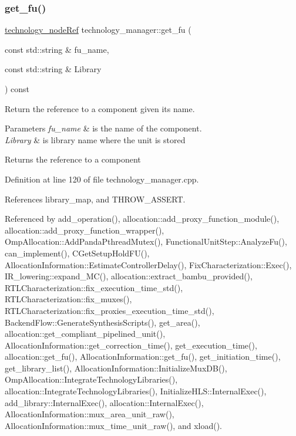 \subsubsection{\texorpdfstring{get\+\_\+fu()}{get\_fu()}}
{\footnotesize\ttfamily \hyperlink{technology__node_8hpp_a33dd193b7bd6b987bf0d8a770a819fa7}{technology\+\_\+node\+Ref} technology\+\_\+manager\+::get\+\_\+fu (\begin{DoxyParamCaption}\item[{const std\+::string \&}]{fu\+\_\+name,  }\item[{const std\+::string \&}]{Library }\end{DoxyParamCaption}) const}



Return the reference to a component given its name. 


\begin{DoxyParams}{Parameters}
{\em fu\+\_\+name} & is the name of the component. \\
\hline
{\em Library} & is library name where the unit is stored \\
\hline
\end{DoxyParams}
\begin{DoxyReturn}{Returns}
the reference to a component 
\end{DoxyReturn}


Definition at line 120 of file technology\+\_\+manager.\+cpp.



References library\+\_\+map, and T\+H\+R\+O\+W\+\_\+\+A\+S\+S\+E\+RT.



Referenced by add\+\_\+operation(), allocation\+::add\+\_\+proxy\+\_\+function\+\_\+module(), allocation\+::add\+\_\+proxy\+\_\+function\+\_\+wrapper(), Omp\+Allocation\+::\+Add\+Panda\+Pthread\+Mutex(), Functional\+Unit\+Step\+::\+Analyze\+Fu(), can\+\_\+implement(), C\+Get\+Setup\+Hold\+F\+U(), Allocation\+Information\+::\+Estimate\+Controller\+Delay(), Fix\+Characterization\+::\+Exec(), I\+R\+\_\+lowering\+::expand\+\_\+\+M\+C(), allocation\+::extract\+\_\+bambu\+\_\+provided(), R\+T\+L\+Characterization\+::fix\+\_\+execution\+\_\+time\+\_\+std(), R\+T\+L\+Characterization\+::fix\+\_\+muxes(), R\+T\+L\+Characterization\+::fix\+\_\+proxies\+\_\+execution\+\_\+time\+\_\+std(), Backend\+Flow\+::\+Generate\+Synthesis\+Scripts(), get\+\_\+area(), allocation\+::get\+\_\+compliant\+\_\+pipelined\+\_\+unit(), Allocation\+Information\+::get\+\_\+correction\+\_\+time(), get\+\_\+execution\+\_\+time(), allocation\+::get\+\_\+fu(), Allocation\+Information\+::get\+\_\+fu(), get\+\_\+initiation\+\_\+time(), get\+\_\+library\+\_\+list(), Allocation\+Information\+::\+Initialize\+Mux\+D\+B(), Omp\+Allocation\+::\+Integrate\+Technology\+Libraries(), allocation\+::\+Integrate\+Technology\+Libraries(), Initialize\+H\+L\+S\+::\+Internal\+Exec(), add\+\_\+library\+::\+Internal\+Exec(), allocation\+::\+Internal\+Exec(), Allocation\+Information\+::mux\+\_\+area\+\_\+unit\+\_\+raw(), Allocation\+Information\+::mux\+\_\+time\+\_\+unit\+\_\+raw(), and xload().

